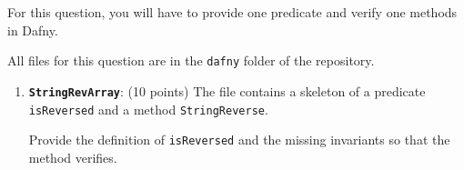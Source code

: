 For this question, you will have to provide one predicate and verify one methods
in Dafny. 

All files for this question are in the \texttt{dafny} folder of
the repository.

\begin{enumerate}[label=(\alph*)]
\item \textbf{\texttt{StringRevArray}}: (10 points) The file contains a skeleton of a predicate
  \texttt{isReversed} and a method \texttt{StringReverse}.

  Provide the definition of \texttt{isReversed} and the missing invariants so that the
  method verifies.
\end{enumerate}
